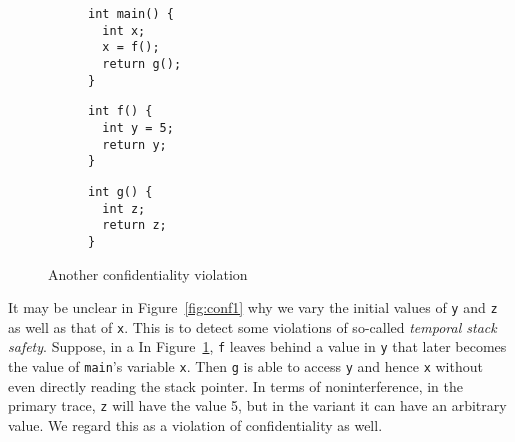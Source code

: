 \documentclass[10pt,conference]{ieeetran}%
\theoremstyle{definition}
\begin{document}
\begin{figure}
\begin{subfigure}[t]{.32\columnwidth}
  {\small
\begin{verbatim}
int main() {
  int x;
  x = f();
  return g();
}
\end{verbatim}
  }
\end{subfigure}
\begin{subfigure}[t]{.32\columnwidth}
  {\small
\begin{verbatim}
int f() {
  int y = 5;
  return y;
}
\end{verbatim}
  }
\end{subfigure}
\begin{subfigure}[t]{.32\columnwidth}
  {\small
\begin{verbatim}
int g() {
  int z;
  return z;
}
\end{verbatim}
  }
\end{subfigure}
\caption{Another confidentiality violation}
\label{fig:conf2}
\end{figure}

It may be unclear in Figure~\ref{fig:conf1} why we vary the initial values of {\tt y}
and {\tt z} as well as that of {\tt x}. This is to detect some violations of so-called
{\em temporal stack safety}. Suppose, in a
In Figure~\ref{fig:conf2}, {\tt f} leaves behind a value in {\tt y}
that later becomes the value of {\tt main}'s variable {\tt x}. Then {\tt g} is able to access
{\tt y} and hence {\tt x} without even directly reading the stack pointer. In terms of noninterference,
in the primary trace, {\tt z} will have the value 5, but in the variant it can have
an arbitrary value. We regard this as a violation of confidentiality as well.
\end{document}

